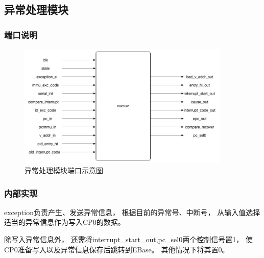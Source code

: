     \subsection{异常处理模块}
        \subsubsection{端口说明}
            
            \begin{figure}[!hbp]
                \centering
                \caption{异常处理模块端口示意图}
                \includegraphics[width=0.9\textwidth]{chart/exception.jpg}
            \end{figure}
        \subsubsection{内部实现}

	        exception负责产生、发送异常信息，%
            根据目前的异常号、中断号，%
            从输入值选择适当的异常信息作为写入CP0的数据。%
	        
            除写入异常信息外，%
            还需将interrupt\_start\_out,pc\_sel0两个控制信号置1，%
            使CP0准备写入以及异常信息保存后跳转到EBase。%
            其他情况下将其置0。


